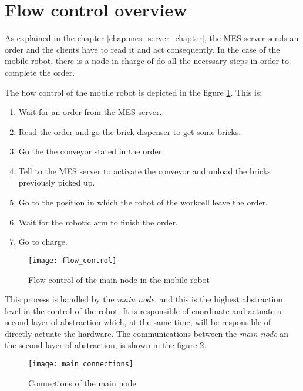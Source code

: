 \section{Flow control overview} %
\label{sec:mr_flow_control_overview}

As explained in the chapter \ref{chap:mes_server_chapter}, the MES server sends an order and the clients have to read it and act consequently.
In the case of the mobile robot, there is a node in charge of do all the necessary steps in order to complete the order.

The flow control of the mobile robot is depicted in the figure \ref{fig:flow_control}.
This is:
\begin{enumerate}
	\item Wait for an order from the MES server.
	\item Read the order and go the brick dispenser to get some bricks.
	\item Go the the conveyor stated in the order.
	\item Tell to the MES server to activate the conveyor and unload the bricks previously picked up.
	\item Go to the position in which the robot of the workcell leave the order.
	\item Wait for the robotic arm to finish the order.
	\item Go to charge.
\end{enumerate}

\begin{figure}[H]
	\centering
	\texttt{[image: flow\_control]}
	\caption{Flow control of the main node in the mobile robot}
	\label{fig:flow_control}
\end{figure}

This process is handled by the \emph{main node}, and this is the highest abstraction level in the control of the robot.
It is responsible of coordinate and actuate a second layer of abstraction which, at the same time, will be responsible of directly actuate the hardware.
The communications between the \emph{main node} an the second layer of abstraction, is shown in the figure \ref{fig:main_connections}.

\begin{figure}[H]
	\centering
	\texttt{[image: main\_connections]}
	\caption{Connections of the main node}
	\label{fig:main_connections}
\end{figure}

